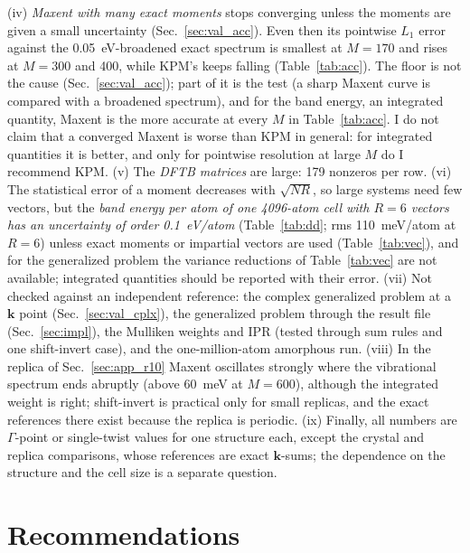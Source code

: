\documentclass[reprint,nofootinbib,superscriptaddress,amsmath,amssymb,aps,prb,floatfix]{revtex4-2}
\begin{document}
(iv) \emph{Maxent with many exact moments} stops converging unless the moments are given a small uncertainty (Sec.~\ref{sec:val_acc}). Even then its pointwise $L_1$ error against the 0.05~eV-broadened exact spectrum is smallest at $M=170$ and rises at $M=300$ and 400, while KPM's keeps falling (Table~\ref{tab:acc}). The floor is not the cause (Sec.~\ref{sec:val_acc}); part of it is the test (a sharp Maxent curve is compared with a broadened spectrum), and for the band energy, an integrated quantity, Maxent is the more accurate at every $M$ in Table~\ref{tab:acc}. I do not claim that a converged Maxent is worse than KPM in general: for integrated quantities it is better, and only for pointwise resolution at large $M$ do I recommend KPM.
(v) The \emph{DFTB matrices} are large: 179 nonzeros per row.
(vi) The statistical error of a moment decreases with $\sqrt{NR}$, so large systems need few vectors, but the \emph{band energy per atom of one 4096-atom cell with $R=6$ vectors has an uncertainty of order 0.1~eV/atom} (Table~\ref{tab:dd}; rms 110~meV/atom at $R=6$) unless exact moments or impartial vectors are used (Table~\ref{tab:vec}), and for the generalized problem the variance reductions of Table~\ref{tab:vec} are not available; integrated quantities should be reported with their error.
(vii) Not checked against an independent reference: the complex generalized problem at a $\mathbf k$ point (Sec.~\ref{sec:val_cplx}), the generalized problem through the result file (Sec.~\ref{sec:impl}), the Mulliken weights and IPR (tested through sum rules and one shift-invert case), and the one-million-atom amorphous run.
(viii) In the replica of Sec.~\ref{sec:app_r10} Maxent oscillates strongly where the vibrational spectrum ends abruptly (above 60~meV at $M=600$), although the integrated weight is right; shift-invert is practical only for small replicas, and the exact references there exist because the replica is periodic.
(ix) Finally, all numbers are $\Gamma$-point or single-twist values for one structure each, except the crystal and replica comparisons, whose references are exact $\mathbf k$-sums; the dependence on the structure and the cell size is a separate question.

\section{Recommendations}
\label{sec:recs}
\end{document}

